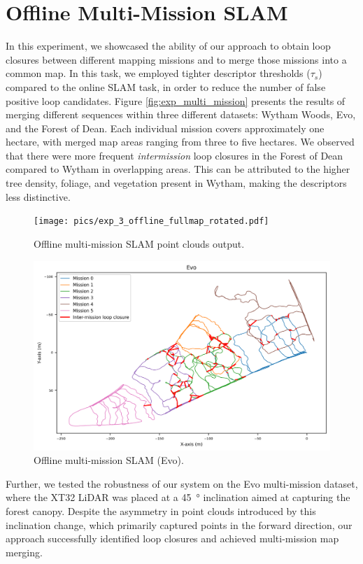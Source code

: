 \section{Offline Multi-Mission SLAM} 
\label{sec:offline_multi_mission}
In this experiment, we showcased the ability of our approach to obtain loop closures between different mapping missions and to merge those missions into a common map. In this task, we employed tighter descriptor thresholds ($\tau_{s}$) compared to the online SLAM task, in order to reduce the number of false positive loop candidates.
Figure \ref{fig:exp_multi_mission} presents the results of merging different sequences within three different datasets: Wytham Woods, Evo, and the Forest of Dean. Each individual mission covers approximately one hectare, with merged map areas ranging from three to five hectares.
We observed that there were more frequent \emph{intermission} loop closures in the Forest of Dean compared to Wytham in overlapping areas. This can be attributed to the higher tree density, foliage, and vegetation present in Wytham, making the descriptors less distinctive.     
\begin{figure}[htbp]
  \centering
  \texttt{[image: pics/exp\_3\_offline\_fullmap\_rotated.pdf]}
  \caption{Offline multi-mission SLAM point clouds output.}
  \includegraphics[width=\columnwidth]{pics/exp_3_1_multimission_slam_evo.png}
  \caption{Offline multi-mission SLAM (Evo).}
  \label{fig:exp_offline_clouds}
\end{figure}

Further, we tested the robustness of our system on the Evo multi-mission dataset, where the XT32 LiDAR was placed at a \SI{45}{\degree} inclination aimed at capturing the forest canopy. Despite the asymmetry in point clouds introduced by this inclination change, which primarily captured points in the forward direction, our approach successfully identified loop closures and achieved multi-mission map merging.

